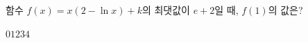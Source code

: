 함수 $f(x)=x(2-\ln x)+k$의 최댓값이 $e+2$일 때, $f(1)$의 값은? 
\begin{choices32}{$0$}{$1$}{$2$}{$3$}{$4$}\end{choices32}
